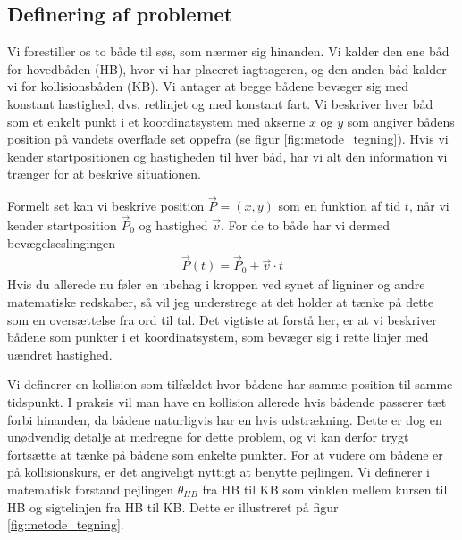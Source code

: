 \documentclass[%
 reprint,
nofootinbib,
aps,
]{revtex4-1}
\begin{document}
\subsection{Definering af problemet}
Vi forestiller os to både til søs, som nærmer sig hinanden. Vi kalder den ene båd for hovedbåden (HB), hvor vi har placeret iagttageren, og den anden båd kalder vi for kollisionsbåden (KB). Vi antager at begge bådene bevæger sig med konstant hastighed, dvs. retlinjet og med konstant fart. Vi beskriver hver båd som et enkelt punkt i et koordinatsystem med akserne $x$ og $y$ som angiver bådens position på vandets overflade set oppefra (se figur \ref{fig:metode_tegning}). Hvis vi kender startpositionen og hastigheden til hver båd, har vi alt den information vi trænger for at beskrive situationen. \par Formelt set kan vi beskrive position $\vec{P} = (x, y)$ som en funktion af tid $t$, når vi kender startposition $\vec{P}_0$ og hastighed $\vec{v}$. For de to både har vi dermed bevægelseslingingen
\begin{align}
  \vec{P}(t) =  \vec{P}_0 + \vec{v}\cdot t
  \label{eq:motion}
\end{align}
Hvis du allerede nu føler en ubehag i kroppen ved synet af ligniner og andre matematiske redskaber, så vil jeg understrege at det holder at tænke på dette som en oversættelse fra ord til tal. Det vigtiste at forstå her, er at vi beskriver bådene som punkter i et koordinatsystem, som bevæger sig i rette linjer med uændret hastighed. \par
Vi definerer en kollision som tilfældet hvor bådene har samme position til samme tidspunkt. I praksis vil man have en kollision allerede hvis bådende passerer tæt forbi hinanden, da bådene naturligvis har en hvis udstrækning. Dette er dog en unødvendig detalje at medregne for dette problem, og vi kan derfor trygt fortsætte at tænke på bådene som enkelte punkter. For at vudere om bådene er på kollisionskurs, er det angiveligt nyttigt at benytte pejlingen. Vi definerer i matematisk forstand pejlingen $\theta_{HB}$ fra HB til KB som vinklen mellem kursen til HB og sigtelinjen fra HB til KB. Dette er illustreret på figur \ref{fig:metode_tegning}.
\end{document}

